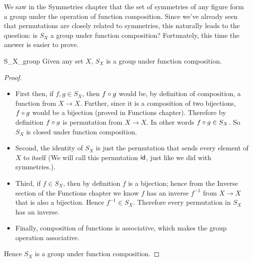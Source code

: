 
We saw in the Symmetries chapter that the set of symmetries of any figure form a group under the operation of function composition. Since we've already seen that permutations are closely related to symmetries, this naturally leads to the question:  is $S_X$ a group under function composition?  Fortunately, this time the answer is easier to prove.

\begin{prop}{S_X_group}
Given any set $X$, $S_X$ is a group under function composition.
\end{prop}

\begin{proof}
\begin{itemize}
\item
First then, if $f, g \in S_X$, then $f \circ g$ would be, by definition of composition, a function from $X \to X$.  Further, since it is a composition of two bijections, $f \circ g$ would be a bijection (proved in Functions chapter).  Therefore by definition $f \circ g$ is permutation from $X \to X$.  In other words $f \circ g \in S_X$.  So $S_X$ is closed under function composition.
\item
Second, the identity of $S_X$ is just the permutation that sends every element of $X$ to itself (We will call this permutation ${\sf{i}d}$, just like we did with symmetries.).  
\item
Third, if $f \in S_X$, then by definition $f$ is a bijection; hence from the Inverse section of the Functions chapter we know $f$ has an inverse $f^{-1}$ from $X \to X$ that is also a bijection.  Hence $f^{-1} \in S_X$.  Therefore every permutation in $S_X$ has an inverse. 
\item
Finally, composition of functions is associative, which makes the group operation associative.  
\end{itemize}

Hence $S_X$ is a group under function composition.
\end{proof}

